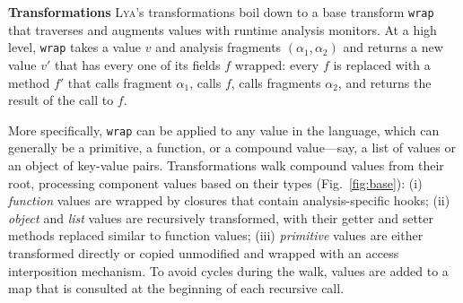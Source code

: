 \documentclass[letterpaper,twocolumn,10pt]{article}
\newcommand{\heading}[1]{\vspace{2pt}\noindent\textbf{#1}\enspace}
\newcommand{\ttt}[1]{\texttt{#1}}
\newcommand{\sys}{{\scshape Lya}\xspace}
\newcommand{\pc}{PIC\xspace}
\begin{document}
\heading{Transformations}
\sys's transformations boil down to a base transform \ttt{wrap} that traverses and augments values with runtime analysis monitors.
At a high level, \ttt{wrap} takes a value $v$ and analysis fragments $(\alpha_1, \alpha_2)$ and returns a new value $v'$ that has every one of its fields $f$ wrapped:
   every $f$ is replaced with a method $f'$ that calls fragment $\alpha_1$, calls $f$, calls fragments $\alpha_2$, and returns the result of the call to $f$.

More specifically, \ttt{wrap} can be applied to any value in the language, which can generally be a primitive, a function, or a compound value---say, a list of values or an object of key-value pairs.
Transformations walk compound values from their root, processing component values based on their types (Fig.~\ref{fig:base}):
  (i) \emph{function} values are wrapped by closures that contain analysis-specific hooks; %
  (ii) \emph{object} and \emph{list} values are recursively transformed, with their getter and setter methods replaced similar to function values; %
  (iii) \emph{primitive} values are either transformed directly or copied unmodified and wrapped with an access interposition mechanism.
To avoid cycles during the walk, values are added to a map that is consulted at the beginning of each recursive call.


% 
% 
% 
\end{document}
